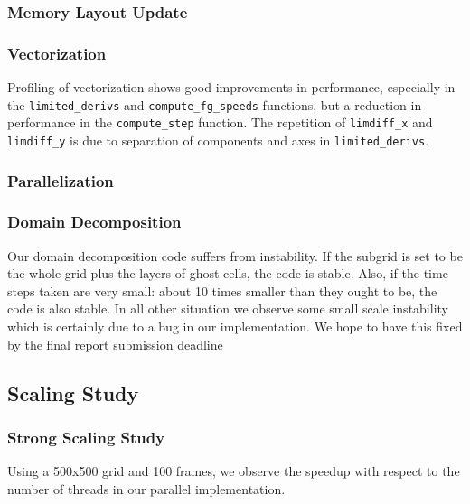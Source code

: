 \documentclass[11pt]{article}
\begin{document}
\subsubsection{Memory Layout Update}

\subsubsection{Vectorization}
Profiling of vectorization shows good improvements in performance, especially in the \texttt{limited\_derivs} and \texttt{compute\_fg\_speeds} functions, but a reduction in performance in the \texttt{compute\_step} function. The repetition of \texttt{limdiff\_x} and \texttt{limdiff\_y} is due to separation of components and axes in \texttt{limited\_derivs}. 


\subsubsection{Parallelization}

\subsubsection{Domain Decomposition}
Our domain decomposition code suffers from instability. If the subgrid is set to be the whole grid plus the layers of ghost cells, the code is stable. Also, if the time steps taken are very small: about 10 times smaller than they ought to be, the code is also stable. In all other situation we observe some small scale instability which is certainly due to a bug in our implementation. We hope to have this fixed by the final report submission deadline

\subsection{Scaling Study} \label{sec:speedup}


\subsubsection{Strong Scaling Study}
Using a 500x500 grid and 100 frames, we observe the speedup with respect to the number of threads in our parallel implementation.
\end{document}
